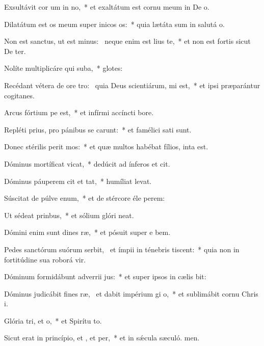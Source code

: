 \item Exsultávit cor um in no,~* et exaltátum est cornu meum in De o.
\item Dilatátum est os meum super inicos os:~* quia lætáta sum in salutá o.
\item Non est sanctus, ut est minus:~\pscross{} neque enim est lius  te,~* et non est fortis sicut De ter.
\item Nolíte multiplicáre qui suba,~* glotes:
\item Recédant vétera de ore tro:~\pscross{} quia Deus scientiárum, mi est,~* et ipsi præparántur cogitanes.
\item Arcus fórtium pe est,~* et infírmi accíncti  bore.
\item Repléti prius, pro pánibus se carunt:~* et famélici sati sunt.
\item Donec stérilis perit mos:~* et quæ multos habébat fílios, inta est.
\item Dóminus mortíficat  vicat,~* dedúcit ad ínferos et cit.
\item Dóminus páuperem cit et tat,~* humíliat  levat.
\item Súscitat de púlve enum,~* et de stércore éle perem:
\item Ut sédeat  prinbus,~* et sólium glóri neat.
\item Dómini enim sunt dines ræ,~* et pósuit super e bem.
\item Pedes sanctórum suórum serbit,~\pscross{} et ímpii in ténebris tiscent:~* quia non in fortitúdine sua roborá vir.
\item Dóminum formidábunt adverrii jus:~* et super ipsos in cælis bit:
\item Dóminus judicábit fines ræ,~\pscross{} et dabit impérium gi o,~* et sublimábit cornu Chris i.
\item Glória tri, et o,~* et Spirítu to.
\item Sicut erat in princípio, et , et per,~* et in sǽcula sæculó. men.
